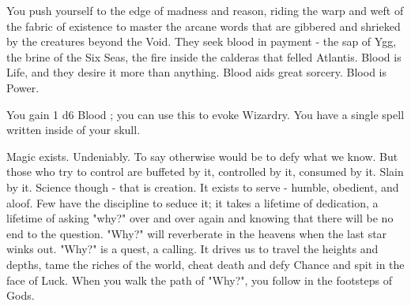 {    


  You push yourself to the edge of madness and reason, riding the warp and weft of the fabric of existence to master the arcane words that are gibbered and shrieked by the creatures beyond the Void.  They seek blood in payment - the sap of  Ygg, the brine of the Six Seas, the fire inside the calderas that felled Atlantis.  Blood is Life, and they desire it more than anything.  Blood aids great sorcery. Blood is Power.  

  You gain 1 d6 Blood \POOL; you can use this \POOL to evoke Wizardry.  You have a single spell written inside of your skull. \footnotemark 


  Magic exists.  Undeniably.  To say otherwise would be to defy what we know.  But those who try to control  are buffeted by it, controlled by it, consumed by it.  Slain by it.  Science though - that is  creation.  It exists to serve - humble, obedient, and aloof.  Few have the discipline to seduce it; it takes a lifetime of dedication, a lifetime of asking "why?" over and over again and knowing that there will be no end to the question.  "Why?" will reverberate in the heavens when the last star winks out.  "Why?" is a quest, a calling.  It drives us to travel the heights and depths, tame the riches of the world, cheat death and defy Chance and spit in the face of Luck.  When you walk the path of "Why?", you follow in the footsteps of Gods.

}
